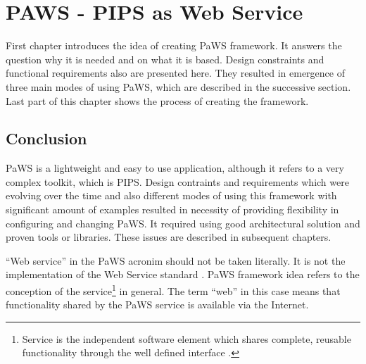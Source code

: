 \chapter{PAWS - PIPS as Web Service}

First chapter introduces the idea of creating PaWS framework. It answers the question why it is needed and on what it is based. Design constraints and functional requirements also are presented here. They resulted in emergence of three main modes of using PaWS, which are described in the successive section. Last part of this chapter shows the process of creating the framework.







\section{Conclusion}

PaWS is a lightweight and easy to use application, although it refers to a very complex toolkit, which is PIPS. Design contraints and requirements which were evolving over the time and also different modes of using this framework with significant amount of examples resulted in necessity of providing flexibility in configuring and changing PaWS. It required using good architectural solution and proven tools or libraries. These issues are described in subsequent chapters.

``Web service'' in the PaWS acronim should not be taken literally. It is not the implementation of the Web Service standard \cite{ws_standard}. PaWS framework idea refers to the conception of the service\footnote{Service is the independent software element which shares complete, reusable  functionality through the well defined interface \cite{service_def}.} in general. The term ``web'' in this case means that functionality shared by the PaWS service is available via the Internet.
